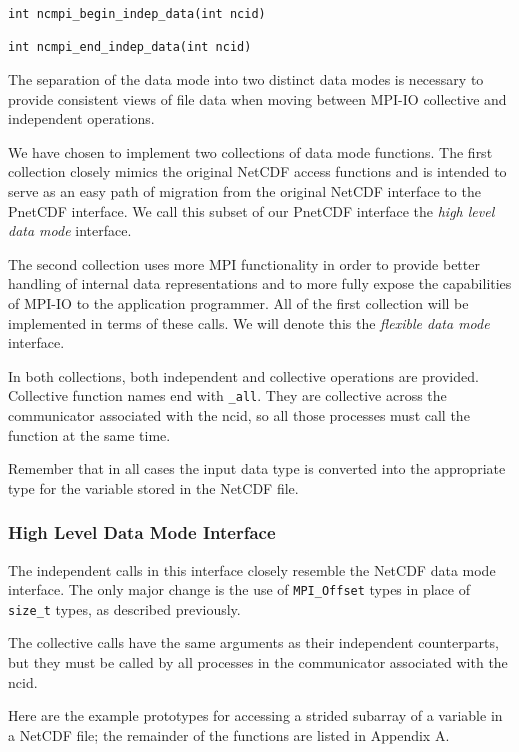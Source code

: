 \documentclass[10pt]{article}
\begin{document}
\begin{verbatim}
int ncmpi_begin_indep_data(int ncid)

int ncmpi_end_indep_data(int ncid)
\end{verbatim}

The separation of the data mode into two distinct data modes is necessary to
provide consistent views of file data when moving between MPI-IO collective
and independent operations.

We have chosen to implement two collections of data mode functions.  The first
collection closely mimics the original NetCDF access functions and is intended
to serve as an easy path of migration from the original NetCDF interface to
the PnetCDF interface.  We call this subset of our PnetCDF
interface the \emph{high level data mode} interface.

The second collection uses more MPI functionality in order to provide better
handling of internal data representations and to more fully expose the
capabilities of MPI-IO to the application programmer.  All of the first
collection will be implemented in terms of these calls.  We will denote this
the \emph{flexible data mode} interface.

In both collections, both independent and collective operations are provided.
Collective function names end with \texttt{\_all}.  They are collective across
the communicator associated with the ncid, so all those processes must call
the function at the same time.

Remember that in all cases the input data type is converted into the
appropriate type for the variable stored in the NetCDF file.

\subsubsection{High Level Data Mode Interface}

The independent calls in this interface closely resemble the NetCDF data mode
interface.  The only major change is the use of \texttt{MPI\_Offset} types in
place of \texttt{size\_t} types, as described previously.

The collective calls have the same arguments as their independent
counterparts, but they must be called by all processes in the communicator
associated with the ncid.

Here are the example prototypes for accessing a strided subarray of a variable
in a NetCDF file; the remainder of the functions are listed in Appendix A.
\end{document}
